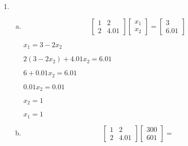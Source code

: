 \documentclass[11pt]{article}
\begin{document}
\begin{enumerate}
	\newpage

	\item
		\begin{enumerate}[(a)]

			\item
			\[
				\begin{bmatrix}
					1 & 2 \\
					2 & 4.01
				\end{bmatrix}
				\begin{bmatrix}
					x_1 \\
					x_2
				\end{bmatrix}
				=
				\begin{bmatrix}
					3 \\
					6.01
				\end{bmatrix}
			\]

			$x_1 = 3-2x_2$

			$2(3-2x_2) + 4.01x_2 = 6.01$

			$6 + 0.01x_2 = 6.01$

			$0.01x_2 = 0.01$

			$x_2 = 1$

			$x_1 = 1$ \\

			\item

			\[
				\begin{bmatrix}
					1 & 2 \\
					2 & 4.01
				\end{bmatrix}
				\begin{bmatrix}
					300 \\
					601
				\end{bmatrix}
				=
			\]

		\end{enumerate}


\end{enumerate}
\end{document}
